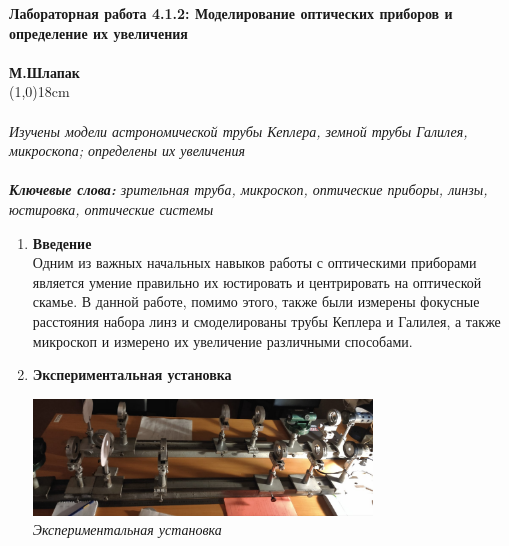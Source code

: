 \documentclass[a4paper]{article}
\begin{document}
 
\large
\noindent \textbf{Лабораторная работа 4.1.2: Моделирование оптических приборов и определение их увеличения}\\
\\
\normalsize
\textbf{М.Шлапак}\\
\line(1,0){18cm}\\
\\
\footnotesize
\textit{Изучены модели астрономической трубы Кеплера, земной трубы Галилея, микроскопа; определены их увеличения}\\
\\
\textit{\textbf{Ключевые слова:} зрительная труба, микроскоп, оптические приборы, линзы, юстировка, оптические системы}\\

\begin{multicols}{2}

\begin{enumerate}
\small
\item \textbf{Введение}\\ 
\noindent 
Одним из важных начальных навыков работы с оптическими приборами является умение правильно их юстировать и центрировать на оптической скамье. В данной работе, помимо этого, также были измерены фокусные расстояния набора линз и смоделированы трубы Кеплера и Галилея, а также микроскоп и измерено их увеличение различными способами.\\
\item \textbf{Экспериментальная установка}
\begin{center}
\includegraphics[width=9cm]{exp1}\\
\textit{Экспериментальная установка}
\end{center}


\end{enumerate}
\end{multicols}
\end{document}
